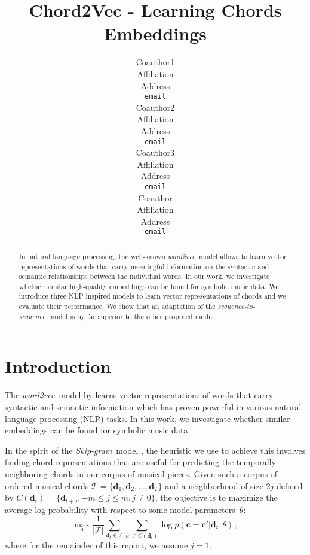 \documentclass{article}
\title{Chord2Vec - Learning Chords Embeddings}
\author{
   Coauthor1 \\
   Affiliation \\
   Address \\
   \texttt{email} \\
   \And
   Coauthor2 \\
   Affiliation \\
   Address \\
   \texttt{email} \\
   \AND
   Coauthor3 \\
   Affiliation \\
   Address \\
   \texttt{email} \\
  \And
   Coauthor \\
   Affiliation \\
   Address \\
   \texttt{email} \\
}
\newcommand{\T}{\mathcal{T}}
\newcommand{\boldc}{\boldsymbol c}
\newcommand{\boldd}{\boldsymbol d}
\newcommand{\skipgram}{\textit{Skip-gram}}
\newcommand{\wordtovec}{\textit{word2vec}}
\newcommand{\seqtoseq}{\textit{sequence-to-sequence}}
\begin{document}

\maketitle

\begin{abstract}
  In natural language processing, the well-known \wordtovec\ model allows to learn  vector representations of words that carry meaningful information on the syntactic and semantic relationships between the individual words. In our work, we investigate whether similar high-quality embeddings can be found for symbolic music data. We introduce three NLP inspired models to learn vector representations of chords and we evaluate their performance. We show that an adaptation of the \seqtoseq\ model is by far superior to the other proposed model. 
  
\end{abstract}

\section{Introduction}

The \wordtovec\ model by \citet{mik2013} learns vector representations of words that carry syntactic and semantic information which has proven powerful in various natural language processing (NLP) tasks. In this work, we investigate whether similar embeddings can be found for symbolic music data. %

In the spirit of the \skipgram\ model \citep{mik2013}, the heuristic we use to achieve this involves finding chord representations that are useful for predicting the temporally neighboring chords in our corpus of musical pieces. Given such a corpus of ordered musical chords  $\T = \{\boldd_1, \boldd_2, \ldots, \boldd_T\}$ and a neighborhood of size $2j$ defined by $ C(\boldd_t) = \{\boldd_{t+j}, -m \leq j \leq m , j \neq 0\}$, the objective is to maximize the average log probability with respect to some model parameters~$\theta$:
%
\begin{equation}
\max_{\theta} \frac{1}{|\T|}\sum_{\boldd_t \in \T} \sum_{\boldc' \in C(\boldd_t)} \log p(\boldc = \boldc'|\boldd_t, \theta)
 \,,
\label{eq:c2v_obj}
\end{equation} 
%
where for the remainder of this report, we assume $j=1$.
\end{document}
